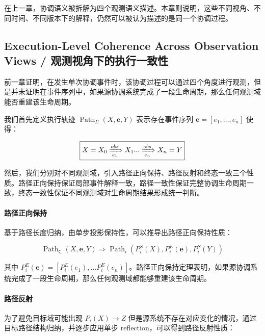   在上一章，协调语义被拆解为四个观测语义描述。本章则说明，这些不同视角、不同时间、不同版本下的解释，仍然可以被认为描述的是同一个协调过程。

  \subsection{Execution-Level Coherence Across Observation Views /
  观测视角下的执行一致性}

  前一章证明，在发生单次协调事件时，该协调过程可以通过四个角度进行观测，但是并未证明在事件序列中，如果源协调系统完成了一段生命周期，那么任何观测域能否重建该生命周期。

  我们首先定义执行轨迹 $\operatorname{Path}_{\Sigma} (X,\mathbf e,Y)$ 表示存在事件序列 $\mathbf e=[e_1,\dots,e_n]$ 使得：

  \begin{equation}
    \boxed{
      X=X_0
      \xRightarrow[e_1]{obs}
      X_1
      ...
      \xRightarrow[e_n]{obs}
      X_n=Y
    }
    \label{eq:source-observable-execution-path}
  \end{equation}

  然后，我们分别对不同观测域，引入路径正向保持、路径反射和终态一致三个性质。路径正向保持保证局部事件解释一致，路径一致性保证完整协调生命周期一致，终态一致性保证不同观测域对生命周期结果形成统一判断。

  \paragraph{路径正向保持} 基于路径长度归纳，由单步投影保持性，可以推导出路径正向保持性质：

  \begin{equation}
    \boxed{
      \operatorname{Path}_{\mathsf C} (X,\mathbf e,Y) \Rightarrow \operatorname{Path}_i (P_i^S(X),P_i^E(\mathbf e),P_i^S(Y))
    }
    \label{eq:path-forward-preservation}
  \end{equation}

  其中 $P_i^E(\mathbf e)=[P_i^E(e_1),...P_i^E(e_n)]$。路径正向保持定理表明，如果源协调系统完成了一段生命周期，那么任何观测域都能够重建该生命周期。

  \paragraph{路径反射} 为了避免目标域可能出现 $P_i(X) \rightarrow Z$ 但是源系统不存在对应变化的情况，通过目标路径结构归纳，并逐步应用单步 reflection，可以得到路径反射性质：

